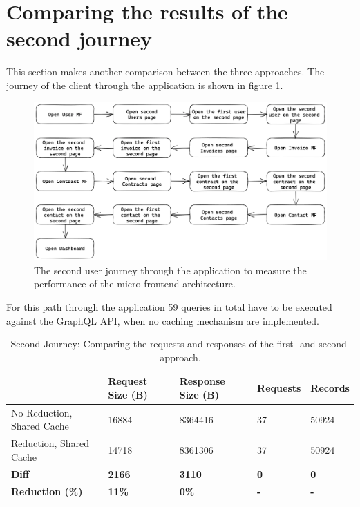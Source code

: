 \section{Comparing the results of the second journey}

This section makes another comparison between the three approaches. The journey of the client through the application is shown in figure \ref{fig:results:evaluation-second-path}.


\ifshowImages
\begin{figure}[H]
\centering
\includegraphics[width=1\linewidth]{images/results/evaluation-second-path.png}
\caption{The second user journey through the application to measure the performance of the micro-frontend architecture.}\label{fig:results:evaluation-second-path}
\end{figure}
\fi

\noindent For this path through the application 59 queries in total have to be executed against the
GraphQL \ac{API}, when no caching mechanism are implemented.

\ifshowTables
\begin{table}[H]
\begin{tabular}{|l|l|l|l|l|}
  \hline
  & Request Size (B) & Response Size (B) & Requests & Records \\
  \hline
  No Reduction, Shared Cache & 16884 & 8364416 & 37 & 50924 \\
  \hline
  Reduction, Shared Cache & 14718 & 8361306 & 37 & 50924 \\
  \hline
  \hline
  \textbf{Diff} & \textbf{2166} & \textbf{3110} & \textbf{0} & \textbf{0} \\
  \hline
  \textbf{Reduction (\%)} & \textbf{11\%} & \textbf{0\%} & \textbf{-} & \textbf{-} \\
  \hline
  \end{tabular}
  \caption{Second Journey: Comparing the requests and responses of the first- and second-approach.}\label{table:results:size-comparison-second-path-no-cache-no-reduction-cache-no-reduction}
\end{table}
\fi

